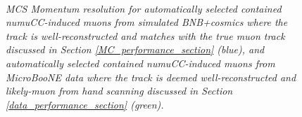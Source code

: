 
\begin{figure}
\centering
\mbox{
	\quad
	}
\caption{\textit{MCS Momentum resolution for automatically selected contained numuCC-induced muons from simulated BNB+cosmics where the track is well-reconstructed and matches with the true muon track discussed in Section \ref{MC_performance_section} (blue), and automatically selected contained numuCC-induced muons from MicroBooNE data where the track is deemed well-reconstructed and likely-muon from hand scanning discussed in Section \ref{data_performance_section} (green).}}\label{pub_plot_4}
\end{figure}

